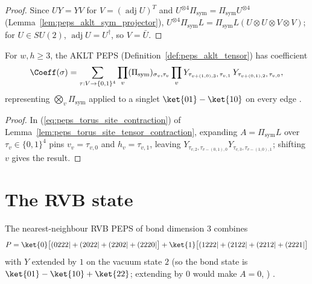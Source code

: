 \begin{proof}\leanok
    Since $UY=YV$ for $V=(\operatorname{adj}U)^T$ and
    $U^{\otimes 4}\Pi_{\mathrm{sym}}=\Pi_{\mathrm{sym}}U^{\otimes 4}$
    (Lemma~\ref{lem:peps_aklt_sym_projector}),
    $U^{\otimes 4}\Pi_{\mathrm{sym}}L=\Pi_{\mathrm{sym}}L(U\otimes U\otimes V\otimes V)$;
    for $U\in SU(2)$, $\operatorname{adj}U=U^\dagger$, so $V=\bar U$.
\end{proof}

\begin{lemma}%
    \label{thm:peps_aklt_state}
    \leanok
    For $w,h\ge 3$, the AKLT PEPS (Definition~\ref{def:peps_aklt_tensor}) has
    coefficient
    \begin{align}
        \Coeff(\sigma)=\sum_{\tau:V\to\{0,1\}^4}\prod_{v}(\Pi_{\mathrm{sym}})_{\sigma_v,\tau_v}
        \prod_{v}Y_{\tau_{v+(1,0),3},\,\tau_{v,1}}\,Y_{\tau_{v+(0,1),2},\,\tau_{v,0}},
        \notag
    \end{align}
    representing $\bigotimes_v\Pi_{\mathrm{sym}}$ applied to a singlet
    $\ket{01}-\ket{10}$ on every edge
    \cite[Appendix~A, ``The AKLT model'']{Cirac2021Matrix}.
\end{lemma}

\begin{proof}\leanok
    In (\ref{eq:peps_torus_site_contraction}) of
    Lemma~\ref{lem:peps_torus_site_tensor_contraction}, expanding
    $A=\Pi_{\mathrm{sym}}L$ over $\tau_v\in\{0,1\}^4$ pins $v_v=\tau_{v,0}$ and
    $h_v=\tau_{v,1}$, leaving
    $Y_{\tau_{v,2},\tau_{v-(0,1),0}}Y_{\tau_{v,3},\tau_{v-(1,0),1}}$; shifting
    $v$ gives the result.
\end{proof}

\section{The RVB state}%
\label{sec:peps_rvb}

The nearest-neighbour RVB PEPS of bond dimension $3$ combines
\begin{align}
    P=\ket{0}\bigl[(0222|+(2022|+(2202|+(2220|\bigr]
    +\ket{1}\bigl[(1222|+(2122|+(2212|+(2221|\bigr]
    \notag
\end{align}
with $Y$ extended by $1$ on the vacuum state $2$ (so the bond state is
$\ket{01}-\ket{10}+\ket{22}$; extending by $0$ would make $A=0$,
\cite{gap:rmp_peps_rvb_bond_vacuum})
\cite[Appendix~A, ``The RVB state'']{Cirac2021Matrix}.

